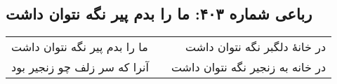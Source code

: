 \begin{center}
\section*{رباعی شماره ۴۰۳: ما را بدم پیر نگه نتوان داشت}
\label{sec:0403}
\begin{longtable}{l p{0.5cm} r}
ما را بدم پیر نگه نتوان داشت
&&
در خانهٔ دلگبر نگه نتوان داشت
\\
آنرا که سر زلف چو زنجیر بود
&&
در خانه به زنجیر نگه نتوان داشت
\\
\end{longtable}
\end{center}
